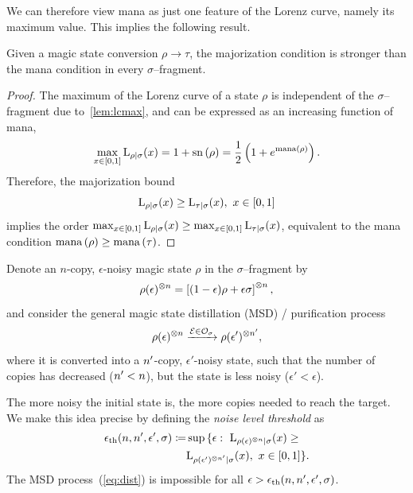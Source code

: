 \documentclass[pra,
aps,
twocolumn,
superscriptaddress,
groupedaddress,
nofootinbib,
reprint
]{revtex4-1}
\begin{document}
We can therefore view mana as just one feature of the Lorenz curve, namely its maximum value. 
This implies the following result.
\begin{theorem}\label{thm:bounds}
    Given a magic state conversion $\rho \longrightarrow \tau$, the majorization condition is stronger than the mana condition in every $\sigma$--fragment.
\end{theorem}
\begin{proof}
    The maximum of the Lorenz curve of a state $\rho$ is independent of the $\sigma$--fragment due to~\cref{lem:lcmax}, and can be expressed as an increasing function of mana,
    \begin{equation}
        \max_{x\in[0,1]}{\lc{\rho}{\sigma}(x)} = 1 + \sn{\rho} = \frac{1}{2} \left( 1 + e^\mana{\rho} \right).
    \end{equation}
    Therefore, the majorization bound
    \begin{equation}
    	\lc{\rho}{\sigma}(x) \geq \lc{\tau}{\sigma}(x),\ x\in[0,1]
    \end{equation}
    implies the order $\max_{x\in[0,1]}{\lc{\rho}{\sigma}(x)} \geq \max_{x\in[0,1]}{\lc{\tau}{\sigma}(x)}$, equivalent to the mana condition $\mana{\rho} \geq \mana{\tau}$.
\end{proof}

Denote an $n$-copy, $\epsilon$-noisy magic state $\rho$ in the $\sigma$--fragment by
\begin{equation}\label{eq:dist}
    \rho(\epsilon)\too{\nn} = \left[ (1 - \epsilon) \rho + \epsilon \sigma \right]\too{\nn},
\end{equation}
and consider the general magic state distillation (MSD) / purification process
\begin{equation}
		\rho(\epsilon)\too{\nn} \xrightarrow{\E \in \O_\sigma} \rho(\epsilon')\too{\tt},
\end{equation}
where it is converted into a $\tt$-copy, $\epsilon'$-noisy state, such that the number of copies has decreased ($\tt < \nn$), but the state is less noisy ($\epsilon' < \epsilon$).

The more noisy the initial state is, the more copies needed to reach the target. 
We make this idea precise by defining the \emph{noise level threshold} as
\begin{equation}\label{eq:ethresh}
	\begin{split}
	\epsilon_{\rm{th}}(\nn, \tt, \epsilon', \sigma) \coloneqq &\sup{\{\epsilon:\ \lc{\rho(\epsilon)\too{\nn}}{\sigma}}(x) \geq \\
	&{\lc{\rho(\epsilon')\too{\tt}}{\sigma}(x),\ x\in[0,1]\}}.
	\end{split}
\end{equation}
The MSD process~(\ref{eq:dist}) is impossible for all $\epsilon > \epsilon_{\rm{th}}(\nn, \tt, \epsilon', \sigma)$.
\end{document}

